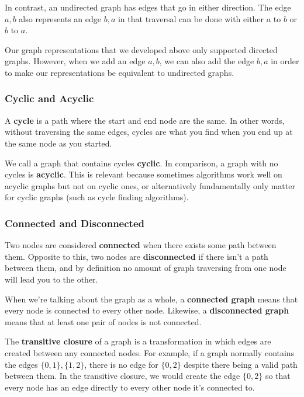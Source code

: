 In contrast, an undirected graph has edges that go in either direction. The edge $a,b$ also represents an edge $b,a$ in that traversal can be done with either $a$ to $b$ or $b$ to $a$.

Our graph representations that we developed above only supported directed graphs. However, when we add an edge $a,b$, we can also add the edge $b,a$ in order to make our representations be equivalent to undirected graphs.

\subsubsection{Cyclic and Acyclic}
  

A \textbf{cycle} is a path where the start and end node are the same. In other words, without traversing the same edges, cycles are what you find when you end up at the same node as you started.

We call a graph that contains cycles \textbf{cyclic}. In comparison, a graph with no cycles is \textbf{acyclic}. This is relevant because sometimes algorithms work well on acyclic graphs but not on cyclic ones, or alternatively fundamentally only matter for cyclic graphs (such as cycle finding algorithms).

\subsubsection{Connected and Disconnected}
  

Two nodes are considered \textbf{connected} when there exists some path between them. Opposite to this, two nodes are \textbf{disconnected} if there isn't a path between them, and by definition no amount of graph traversing from one node will lead you to the other.

When we're talking about the graph as a whole, a \textbf{connected graph} means that every node is connected to every other node. Likewise, a \textbf{disconnected graph} means that at least one pair of nodes is not connected.

The \textbf{transitive closure}  of a graph is a transformation in which edges are created between any connected nodes. For example, if a graph normally contains the edges $\{0,1\},\{1,2\}$, there is no edge for $\{0,2\}$ despite there being a valid path between them. In the transitive closure, we would create the edge $\{0,2\}$ so that every node has an edge directly to every other node it's connected to.

